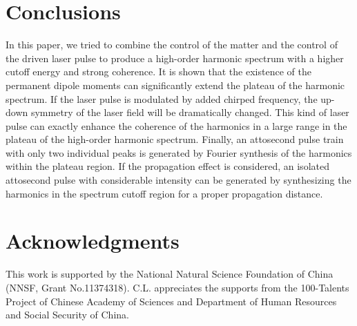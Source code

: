 \documentclass[10pt,letterpaper]{article}
\begin{document}


\section{Conclusions}
In this paper, we tried to combine the control of the matter and the control of the driven laser pulse to produce a high-order harmonic spectrum with a higher cutoff energy and strong coherence. It is shown that the existence of the permanent dipole moments can significantly extend the plateau of the harmonic spectrum. If the laser pulse is modulated by added chirped frequency, the up-down symmetry of the laser field will be dramatically changed. This kind of laser pulse can exactly enhance the coherence of the harmonics in a large range in the plateau of the high-order harmonic spectrum. Finally, an attosecond pulse train with only two individual peaks is generated by Fourier synthesis of the harmonics within the plateau region. If the propagation effect is considered, an isolated attosecond pulse with considerable intensity can be generated by synthesizing the harmonics in the spectrum cutoff region for a proper propagation distance.

\section*{Acknowledgments}
This work is supported by the National Natural Science Foundation of China (NNSF, Grant
No.11374318). C.L. appreciates the supports from the 100-Talents Project of Chinese Academy
of Sciences and Department of Human Resources and Social Security of China.
\end{document}
